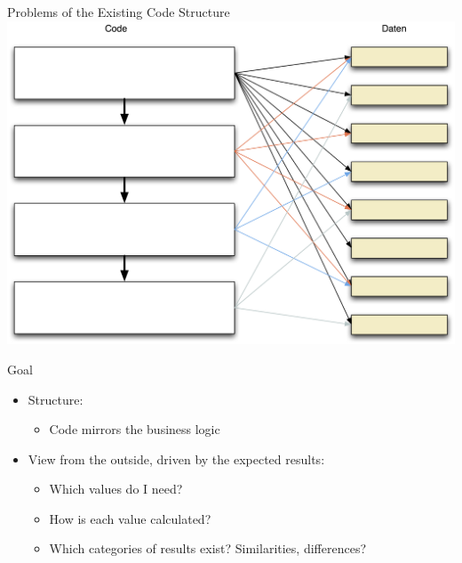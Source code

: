 \begin{frame}[fragile]{Problems of the Existing Code Structure}
\includegraphics[width=.85 \paperwidth]{Codestruktur.png}
\end{frame}

\begin{frame}[fragile]{Goal}
\begin{itemize}
\item Structure:
\begin{itemize}
\item Code mirrors the business logic
\end{itemize}
\end{itemize}

\begin{itemize}
\item View from the outside, driven by the expected results:
\begin{itemize}
\item Which values do I need?
\item How is each value calculated?
\item Which categories of results exist? Similarities, differences?
\end{itemize}
\end{itemize}
\end{frame}

